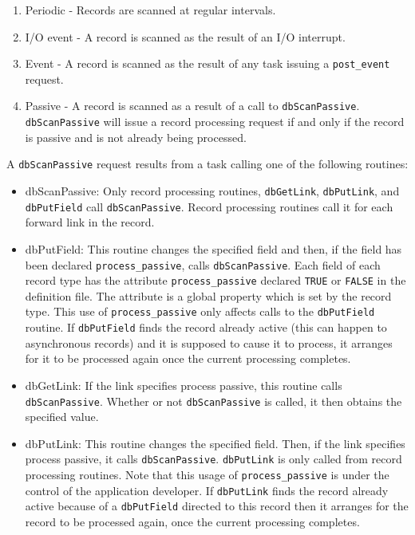 \begin{enumerate}
\item {}Periodic - Records are scanned at regular intervals.

\item {}I/O event - A record is scanned as the result of an I/O interrupt.

\item {}Event - A record is scanned as the result of any task issuing a \verb|post_event| request.

\item {}Passive - A record is scanned as a result of a call to \verb|dbScanPassive|.
\verb|dbScanPassive| will issue a record processing request if and only if the record is passive and is not already being processed.

\end{enumerate}

A \verb|dbScanPassive| request results from a task calling one of the following routines:

\begin{itemize}
\item {}dbScanPassive:  Only record processing routines, \verb|dbGetLink|, \verb|dbPutLink|, and \verb|dbPutField| call \verb|dbScanPassive|.
Record processing routines call it for each forward link in the record.

\item {}dbPutField: This routine changes the specified field and then, if the field has been declared \verb|process_passive|, calls \verb|dbScanPassive|.
Each field of each record type has the attribute \verb|process_passive| declared \verb|TRUE| or 
\verb|FALSE| in the definition file.
The attribute is a global property which is set by the record type.
This use of \verb|process_passive| only affects calls to the \verb|dbPutField| routine.
If \verb|dbPutField| finds the record already active (this can happen to asynchronous records) and it is supposed to cause it to process, it arranges for it to be processed again once the current processing completes.

\item {}dbGetLink:  If the link specifies process passive, this routine calls \verb|dbScanPassive|.
Whether or not \verb|dbScanPassive| is called, it then obtains the specified value. 

\item {}dbPutLink:  This routine changes the specified field.
Then, if the link specifies process passive, it calls \verb|dbScanPassive|.
\verb|dbPutLink| is only called from record processing routines.
Note that this usage of \verb|process_passive| is under the control of the application developer.
If \verb|dbPutLink| finds the record already active because of a \verb|dbPutField| directed to this record then it arranges for the record to be processed again, once the current processing completes.

\end{itemize}

